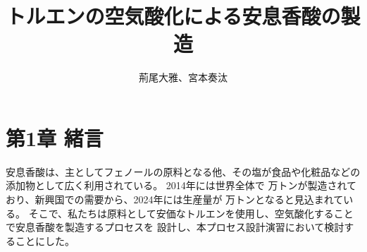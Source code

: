 \documentclass[a4j]{jsarticle}
\begin{document}
\title{トルエンの空気酸化による安息香酸の製造}
\author{荊尾大雅、宮本奏汰}
\maketitle

\newpage

\section*{第1章 緒言}
安息香酸は、主としてフェノールの原料となる他、その塩が食品や化粧品などの添加物として広く利用されている。
2014年には世界全体で 万トンが製造されており、新興国での需要から、2024年には生産量が 万トンとなると見込まれている。
そこで、私たちは原料として安価なトルエンを使用し、空気酸化することで安息香酸を製造するプロセスを
設計し、本プロセス設計演習において検討することにした。

\newpage
\end{document}
